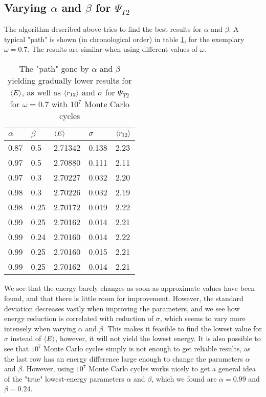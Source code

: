 \documentclass[10pt,a4paper]{article}
\begin{document}
\subsection{Varying $\alpha$ and $\beta$ for $\Psi_{T2}$}
The algorithm described above tries to find the best results for $\alpha$ and $\beta$. A typical "path" is shown (in chronological order) in table \ref{table2}, for the exemplary $\omega=0.7$. The results are similar when using different values of $\omega$.
\begin{table}[H]
\centering
\caption[Varying $\alpha$ and $\beta$]{The "path" gone by  $\alpha$ and $\beta$ yielding gradually lower results for  $\braket{E}$, as well as  $\braket{r_{12}}$ and $\sigma$ for $\Psi_{T2}$ for $\omega=0.7$ with $10^7$ Monte Carlo cycles}
\begin{tabular}{|l|l|l|l|l|}
\hline
$\alpha$ & $\beta$ & $\braket{E}$ & $\sigma$ & $\braket{r_{12}}$ \\ \hline
0.87     & 0.5     & 2.71342        & 0.138    & 2.23              \\ \hline
0.97     & 0.5     & 2.70880       & 0.111    & 2.11              \\ \hline
0.97     & 0.3     & 2.70227        & 0.032    & 2.20              \\ \hline
0.98     & 0.3     & 2.70226        & 0.032    & 2.19              \\ \hline
0.98     & 0.25    & 2.70172        & 0.019    & 2.22              \\ \hline
0.99     & 0.25    & 2.70162        & 0.014    & 2.21              \\ \hline
0.99     & 0.24    & 2.70160        & 0.014    & 2.22              \\ \hline
0.99     & 0.25    & 2.70160        & 0.015    & 2.21              \\ \hline
0.99     & 0.25    & 2.70162        & 0.014    & 2.21              \\ \hline
\end{tabular}\label{table2}
\end{table}
We see that the energy barely changes as soon as approximate values have been found, and that there is little room for improvement. However, the standard deviation decreases vastly when improving the parameters, and we see how energy reduction is correlated with reduction of $\sigma$, which seems to vary more intensely when varying $\alpha$ and $\beta$. This makes it feasible to find the lowest value for $\sigma$ instead of $\braket{E}$, however, it will not yield the lowest energy. It is also possible to see that $10^7$ Monte Carlo cycles simply is not enough to get reliable results, as the last row has an energy difference large enough to change the parameters $\alpha$ and $\beta$. However, using $10^7$ Monte Carlo cycles works nicely to get a general idea of the "true" lowest-energy parameters $\alpha$ and $\beta$, which we found are $\alpha=0.99$ and $\beta=0.24$.
\end{document}
